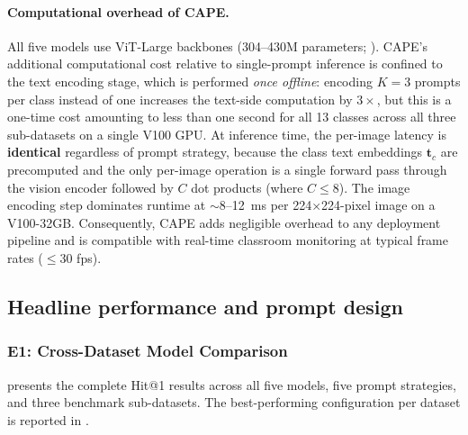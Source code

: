 \documentclass[symmetry,article,submit,pdftex,moreauthors]{Definitions/mdpi}
\begin{document}
\paragraph{Computational overhead of CAPE.}
All five models use ViT-Large backbones (304--430M parameters; ). CAPE's additional computational cost relative to single-prompt inference is confined to the text encoding stage, which is performed \emph{once offline}: encoding $K\!=\!3$ prompts per class instead of one increases the text-side computation by $3\times$, but this is a one-time cost amounting to less than one second for all 13 classes across all three sub-datasets on a single V100 GPU. At inference time, the per-image latency is \textbf{identical} regardless of prompt strategy, because the class text embeddings $\mathbf{t}_c$ are precomputed and the only per-image operation is a single forward pass through the vision encoder followed by $C$ dot products (where $C \leq 8$). The image encoding step dominates runtime at $\sim$8--12~ms per 224$\times$224-pixel image on a V100-32GB. Consequently, CAPE adds negligible overhead to any deployment pipeline and is compatible with real-time classroom monitoring at typical frame rates ($\leq$30 fps).

\subsection{Headline performance and prompt design}

\subsubsection{E1: Cross-Dataset Model Comparison}
\label{sec:e1}

 presents the complete Hit@1 results across all five models, five prompt strategies, and three benchmark sub-datasets.
The best-performing configuration per dataset is reported in .
\end{document}
